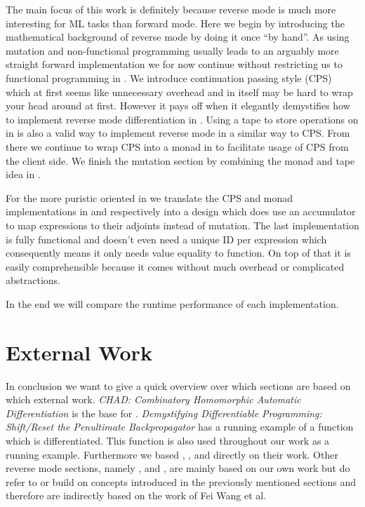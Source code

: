 The main focus of this work is definitely  because reverse mode is much more interesting for ML tasks than forward mode. Here we begin by introducing the mathematical background of reverse mode by doing it once ``by hand''. As using mutation and non-functional programming usually leads to an arguably more straight forward implementation we for now continue without restricting us to functional programming in . We introduce continuation passing style (CPS) which at first seems like unnecessary overhead and in itself may be hard to wrap your head around at first. However it pays off when it elegantly demystifies how to implement reverse mode differentiation in . Using a tape to store operations on in  is also a valid way to implement reverse mode in a similar way to CPS. From there we continue to wrap CPS into a monad in  to facilitate usage of CPS from the client side. We finish the mutation section by combining the monad and tape idea in .

For the more puristic oriented in  we translate the CPS and monad implementations in  and  respectively into a design which does use an accumulator to map expressions to their adjoints instead of mutation. The last implementation  is fully functional and doesn't even need a unique ID per expression which consequently means it only needs value equality to function. On top of that it is easily comprehensible because it comes without much overhead or complicated abstractions.

In the end we will compare the runtime performance of each implementation.

\section{External Work}
In conclusion we want to give a quick overview over which sections are based on which external work. \emph{CHAD: Combinatory Homomorphic Automatic Differentiation} \cite{chad} is the base for . \emph{Demystifying Differentiable Programming: Shift/Reset the Penultimate Backpropagator} \cite{lantern} has a running example of a function which is differentiated. This function is also used throughout our work as a running example. Furthermore we based , ,  and  directly on their work. Other reverse mode sections, namely ,  and , are mainly based on our own work but do refer to or build on concepts introduced in the previously mentioned sections and therefore are indirectly based on the work of Fei Wang et al. 



















